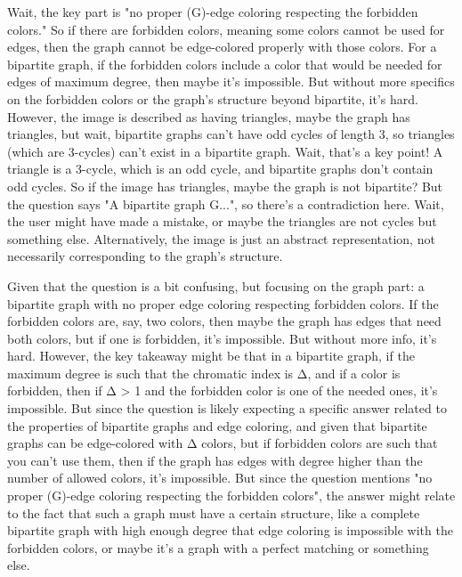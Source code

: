 Wait, the key part is "no proper (G)-edge coloring respecting the forbidden colors." So if there are forbidden colors, meaning some colors cannot be used for edges, then the graph cannot be edge-colored properly with those colors. For a bipartite graph, if the forbidden colors include a color that would be needed for edges of maximum degree, then maybe it's impossible. But without more specifics on the forbidden colors or the graph's structure beyond bipartite, it's hard. However, the image is described as having triangles, maybe the graph has triangles, but wait, bipartite graphs can't have odd cycles of length 3, so triangles (which are 3-cycles) can't exist in a bipartite graph. Wait, that's a key point! A triangle is a 3-cycle, which is an odd cycle, and bipartite graphs don't contain odd cycles. So if the image has triangles, maybe the graph is not bipartite? But the question says "A bipartite graph G...", so there's a contradiction here. Wait, the user might have made a mistake, or maybe the triangles are not cycles but something else. Alternatively, the image is just an abstract representation, not necessarily corresponding to the graph's structure.

Given that the question is a bit confusing, but focusing on the graph part: a bipartite graph with no proper edge coloring respecting forbidden colors. If the forbidden colors are, say, two colors, then maybe the graph has edges that need both colors, but if one is forbidden, it's impossible. But without more info, it's hard. However, the key takeaway might be that in a bipartite graph, if the maximum degree is such that the chromatic index is Δ, and if a color is forbidden, then if Δ > 1 and the forbidden color is one of the needed ones, it's impossible. But since the question is likely expecting a specific answer related to the properties of bipartite graphs and edge coloring, and given that bipartite graphs can be edge-colored with Δ colors, but if forbidden colors are such that you can't use them, then if the graph has edges with degree higher than the number of allowed colors, it's impossible. But since the question mentions "no proper (G)-edge coloring respecting the forbidden colors", the answer might relate to the fact that such a graph must have a certain structure, like a complete bipartite graph with high enough degree that edge coloring is impossible with the forbidden colors, or maybe it's a graph with a perfect matching or something else.

